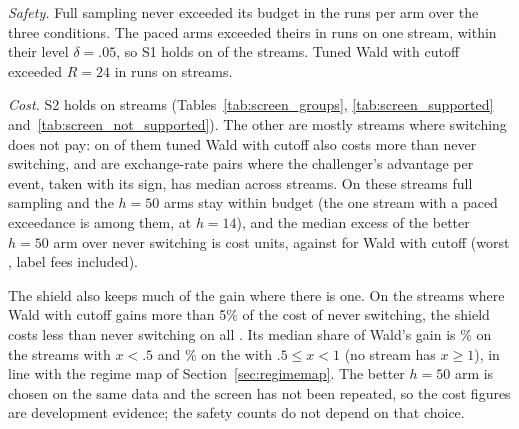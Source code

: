 \documentclass[10pt]{article}
\theoremstyle{plain}
\theoremstyle{definition}
\begin{document}
\emph{Safety.} Full sampling never exceeded its budget in the \ScreenRunsPerArm{} runs per arm over the three conditions. The paced arms exceeded theirs in \ScreenPacedViol{} runs on one stream, within their level $\delta=.05$, so S1 holds on \ScreenSOne{} of the \ScreenPool{} streams. Tuned Wald with cutoff exceeded $R=24$ in \ScreenWaldExceedRuns{} runs on \ScreenWaldExceedStreams{} streams.

\emph{Cost.} S2 holds on \ScreenSupported{} streams (Tables~\ref{tab:screen_groups}, \ref{tab:screen_supported} and~\ref{tab:screen_not_supported}). The other \ScreenNotSupported{} are mostly streams where switching does not pay: on \ScreenLoseWaldAlso{} of them tuned Wald with cutoff also costs more than never switching, and \ScreenOtherForex{} are exchange-rate pairs where the challenger's advantage per event, taken with its sign, has median \ScreenForexAdv{} across streams. On these streams full sampling and the $h=50$ arms stay within budget (the one stream with a paced exceedance is among them, at $h=14$), and the median excess of the better $h=50$ arm over never switching is \ScreenLoseShieldMed{} cost units, against \ScreenLoseWaldMed{} for Wald with cutoff (worst \ScreenWorstExcess, label fees included).

The shield also keeps much of the gain where there is one. On the \ScreenGainful{} streams where Wald with cutoff gains more than 5\% of the cost of never switching, the shield costs less than never switching on all \ScreenGainfulShieldBeatsNever. Its median share of Wald's gain is \ScreenKeepLo\% on the \ScreenGainfulLo{} streams with $x<.5$ and \ScreenKeepMid\% on the \ScreenGainfulMid{} with $.5\le x<1$ (no stream has $x\ge1$), in line with the regime map of Section~\ref{sec:regimemap}. The better $h=50$ arm is chosen on the same data and the screen has not been repeated, so the cost figures are development evidence; the safety counts do not depend on that choice.
\end{document}
